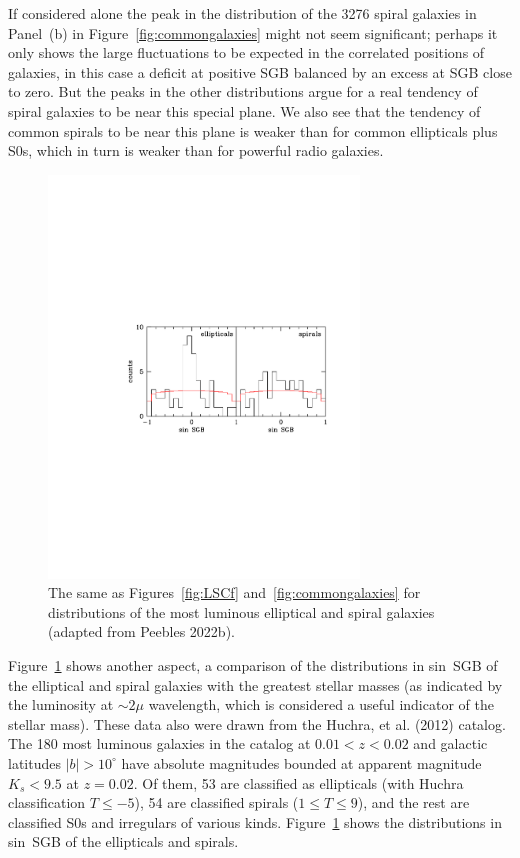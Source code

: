 \documentclass[fleqn,12pt]{article}
\begin{document}
If considered alone the peak in the distribution of the 3276 spiral galaxies in Panel~(b) in Figure~\ref{fig:commongalaxies} might not seem significant; perhaps it only shows the large fluctuations to be expected in the correlated positions of galaxies, in this case a deficit at positive SGB balanced by an excess at SGB close to zero. But the peaks in the other distributions argue for a real tendency of spiral galaxies to be near this special plane. We also see that the tendency of common spirals to be near this plane is weaker than for common ellipticals plus S0s, which in turn is weaker than for powerful radio galaxies. 

\begin{figure}
\begin{center}
\includegraphics[angle=0,width=3.25in]{morphologies.pdf} 
\caption{The same as Figures~\ref{fig:LSCf} and~\ref{fig:commongalaxies} for distributions of the most luminous elliptical and spiral galaxies (adapted from Peebles 2022b).}\label{fig:morphologies}
\end{center}
\end{figure}

Figure~\ref{fig:morphologies} shows another aspect, a  comparison of the distributions in sin~SGB of the elliptical and spiral galaxies with the greatest stellar masses (as indicated by the luminosity at $\sim 2\mu$ wavelength, which is considered a useful indicator of the stellar mass). These data also were drawn from the Huchra, et al. (2012) catalog. The 180 most luminous galaxies in the catalog at  $0.01<z<0.02$ and galactic latitudes $|b|>10^\circ$ have absolute magnitudes bounded at apparent magnitude $K_s < 9.5$ at $z=0.02$. Of them, 53 are classified as ellipticals (with Huchra classification $T\leq -5$), 54 are classified spirals ($1\leq T\leq 9$), and the rest are classified S0s and irregulars of various kinds. Figure~\ref{fig:morphologies}  shows the distributions in sin~SGB of the ellipticals and spirals.
\end{document}
